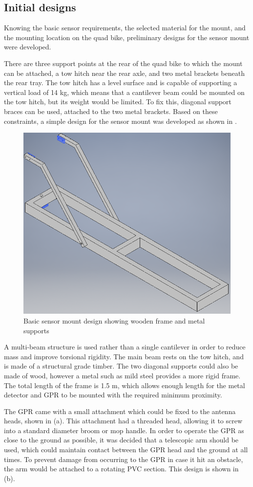 \documentclass[main.tex]{subfiles}
\begin{document}
\subsection{Initial designs}
Knowing the basic sensor requirements, the selected material for the mount, and the mounting location on the quad bike, preliminary designs for the sensor mount were developed. 

There are three support points at the rear of the quad bike to which the mount can be attached, a tow hitch near the rear axle, and two metal brackets beneath the rear tray. The tow hitch has a level surface and is capable of supporting a vertical load of 14 kg, which means that a cantilever beam could be mounted on the tow hitch, but its weight would be limited. To fix this, diagonal support braces can be used, attached to the two metal brackets. Based on these constraints, a simple design for the sensor mount was developed as shown in .

\begin{figure}[ht]
\includegraphics[width=.6\textwidth]{3-ConceptDesign/basic.PNG}
\centering
\caption[Basic sensor mount design]{Basic sensor mount design showing wooden frame and metal supports}
\end{figure}

A multi-beam structure is used rather than a single cantilever in order to reduce mass and improve torsional rigidity. The main beam rests on the tow hitch, and is made of a structural grade timber. The two diagonal supports could also be made of wood, however a metal such as mild steel provides a more rigid frame. The total length of the frame is 1.5 m, which allows enough length for the metal detector and GPR to be mounted with the required minimum proximity. 

The GPR came with a small attachment which could be fixed to the antenna heads, shown in  (a). This attachment had a threaded head, allowing it to screw into a standard diameter broom or mop handle. In order to operate the GPR as close to the ground as possible, it was decided that a telescopic arm should be used, which could maintain contact between the GPR head and the ground at all times. To prevent damage from occurring to the GPR in case it hit an obstacle, the arm would be attached to a rotating PVC section. This design is shown in  (b).
\end{document}
